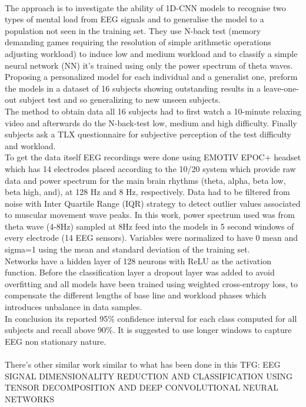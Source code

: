 \leavevmode\\
The approach is to investigate the ability of 1D-CNN models to recognise two types of mental load from EEG signals and to generalise the model to a population not seen in the training set. They use N-back test (memory demanding games requiring the resolution of simple arithmetic operations adjusting workload) to induce low and medium workload and to classify a simple neural network (NN) it’s trained using only the power spectrum of theta waves. Proposing a personalized model for each individual and a generalist one, preform the models in a dataset of 16 subjects showing outstanding results in a leave-one-out subject test and so generalizing to new unseen subjects.
\\
The method to obtain data all 16 subjects had to first watch a 10-minute relaxing video and afterwards do the N-back-test low, medium and high difficulty. Finally subjects ask a TLX questionnaire for subjective perception of the test difficulty and workload.
\\
To get the data itself EEG recordings were done using EMOTIV EPOC+ headset which has 14 electrodes placed according to the 10/20 system which provide raw data and power spectrum for the main brain rhythms (theta, alpha, beta low, beta high, and), at 128 Hz and 8 Hz, respectively. Data had to be filtered from noise with Inter Quartile Range (IQR) strategy to detect outlier values associated to muscular movement wave peaks. In this work, power spectrum used was from theta wave (4-8Hz) sampled at 8Hz feed into the models in 5 second windows of every electrode (14 EEG sensors). Variables were normalized to have 0 mean and
sigma=1 using the mean and standard deviation of the training set. 
\\
Networks have a hidden layer of 128 neurons with ReLU as the activation function. Before the classification layer a dropout layer was added to avoid overfitting and all models have been trained using weighted cross-entropy loss, to compensate the different lengths of base line and workload phases which introduces unbalance in data samples.
\\
In conclusion its reported 95\% confidence interval for each class computed for all subjects and recall above 90\%. It is suggested to use longer windows to capture EEG non stationary nature.
\\
\leavevmode\\
There's other similar work similar to what has been done in this TFG: EEG SIGNAL DIMENSIONALITY REDUCTION AND CLASSIFICATION USING TENSOR DECOMPOSITION AND DEEP CONVOLUTIONAL NEURAL NETWORKS
